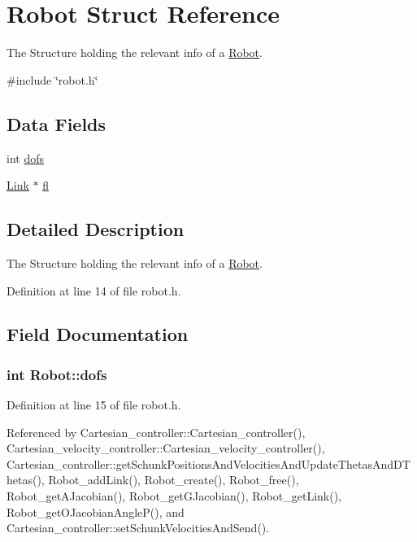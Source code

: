 \hypertarget{structRobot}{\section{Robot Struct Reference}
\label{structRobot}
}


The Structure holding the relevant info of a \hyperlink{structRobot}{Robot}.  




{\ttfamily \#include \char`\"{}robot.\-h\char`\"{}}

\subsection*{Data Fields}
\begin{DoxyCompactItemize}
\item 
int \hyperlink{structRobot_a51d4a86ac5314a1ed8614d5664c80747}{dofs}
\item 
\hyperlink{structLink}{Link} $\ast$ \hyperlink{structRobot_aa983a42f95f55c494fd4154c4d42be47}{fl}
\end{DoxyCompactItemize}


\subsection{Detailed Description}
The Structure holding the relevant info of a \hyperlink{structRobot}{Robot}. 

Definition at line 14 of file robot.\-h.



\subsection{Field Documentation}
\hypertarget{structRobot_a51d4a86ac5314a1ed8614d5664c80747}{
\subsubsection[{dofs}]{\setlength{\rightskip}{0pt plus 5cm}int Robot\-::dofs}}\label{structRobot_a51d4a86ac5314a1ed8614d5664c80747}


Definition at line 15 of file robot.\-h.



Referenced by Cartesian\-\_\-controller\-::\-Cartesian\-\_\-controller(), Cartesian\-\_\-velocity\-\_\-controller\-::\-Cartesian\-\_\-velocity\-\_\-controller(), Cartesian\-\_\-controller\-::get\-Schunk\-Positions\-And\-Velocities\-And\-Update\-Thetas\-And\-D\-Thetas(), Robot\-\_\-add\-Link(), Robot\-\_\-create(), Robot\-\_\-free(), Robot\-\_\-get\-A\-Jacobian(), Robot\-\_\-get\-G\-Jacobian(), Robot\-\_\-get\-Link(), Robot\-\_\-get\-O\-Jacobian\-Angle\-P(), and Cartesian\-\_\-controller\-::set\-Schunk\-Velocities\-And\-Send().

